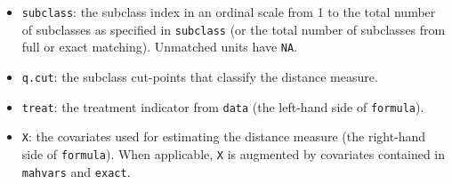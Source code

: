 \begin{itemize}
\item \texttt{subclass}: the subclass index in an ordinal
  scale from 1 to the total number of subclasses as specified in
  \texttt{subclass} (or the total number of subclasses from full or
  exact matching).  Unmatched units have \texttt{NA}.
  
\item \texttt{q.cut}: the subclass cut-points that classify the
  distance measure.
  
\item \texttt{treat}: the treatment indicator from \texttt{data}
  (the left-hand side of \texttt{formula}).
 
\item \texttt{X}: the covariates used for estimating the
  distance measure (the right-hand side of \texttt{formula}).  When
  applicable, \texttt{X} is augmented by covariates contained in
  \texttt{mahvars} and \texttt{exact}. 
\end{itemize}



